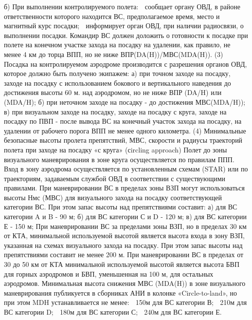 б)	При выполнении контролируемого полета:
	сообщает органу ОВД, в районе ответственности которого находится ВС, предполагаемое время, место и магнитный курс посадки;
	информирует орган ОВД, при наличии радиосвязи, о выполнении посадки. 
Командир ВС должен доложить о готовности к посадке при полете на конечном участке захода на посадку на удалении, как правило, не менее 4 км до торца ВПП, но не ниже ВПР(DA(H))/МВС(MDA(H)).
(3) Посадка на контролируемом аэродроме производится с разрешения органов ОВД, которое должно быть получено экипажем:
а)	при точном заходе на посадку, заходе на посадку с использованием бокового и вертикального наведения до достижения высоты 60 м. над аэродромом, но не ниже ВПР (DA/H) или (MDA/H);
б)	при неточном заходе на посадку - до достижения МВС(MDA/H));
в)	при визуальном заходе на посадку, заходе на посадку с круга, заходе на посадку по ПВП - после вывода ВС на конечный участок захода на посадку, на удалении от рабочего порога ВПП не менее одного километра.
(4) Минимальные безопасные высоты пролета препятствий, МВС, скорости и радиусы траекторий полета при заходе на посадку «с круга» (сircling approach)
Полет до зоны визуального маневрирования в зоне круга осуществляется по правилам ППП.
Вход в зону аэродрома осуществляется по установленным схемам (STAR) или по траекториям, задаваемым службой ОВД в соответствии с существующими правилами.
При маневрировании ВС в пределах зоны ВЗП могут использоваться высоты Нмс (МВС) для визуального захода на посадку соответствующей категории ВС. При этом запас высоты над препятствиями составит:
а)	для ВС категории A и B - 90 м;
б)	для ВС категории С и D - 120 м;
в)	для ВС категории Е - 150 м;
При маневрировании ВС за пределами зоны ВЗП, но в пределах 30 км от КТА, минимальной используемой высотой является высота входа в зону ВЗП, указанная на схемах визуального захода на посадку.
При этом запас высоты над препятствиями составит не менее 200 м.
При маневрировании ВС в пределах от 30 до 50 км от КТА минимальной используемой высотой является высота БВП для горных аэродромов и БВП, уменьшенная на 100 м, для остальных аэродромов.
Минимальная высота снижения МВС (MDA(H)) в зоне визуального маневрирования публикуется в сборниках АНИ в колонке «Circle-to-land», но при этом MDH устанавливается не менее:
   150м для ВС категории В;	 210м для ВС категории D;
   180м для ВС категории С;	 240м для ВС категории Е.


